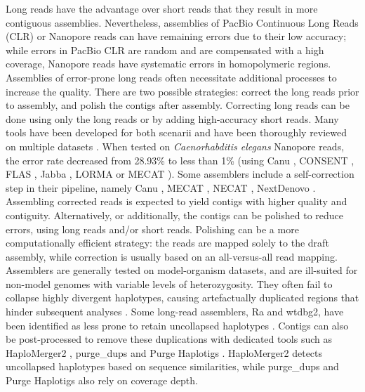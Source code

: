 Long reads have the advantage over short reads that they result in more contiguous assemblies. Nevertheless, assemblies of PacBio Continuous Long Reads (CLR) or Nanopore reads can have remaining errors due to their low accuracy; while errors in PacBio CLR are random and are compensated with a high coverage, Nanopore reads have systematic errors in homopolymeric regions. Assemblies of error-prone long reads often necessitate additional processes to increase the quality. There are two possible strategies: correct the long reads prior to assembly, and polish the contigs after assembly. Correcting long reads can be done using only the long reads or by adding high-accuracy short reads. Many tools have been developed for both scenarii and have been thoroughly reviewed on multiple datasets \cite{correction_benchmark}. When tested on \textit{Caenorhabditis elegans} Nanopore reads, the error rate decreased from 28.93\% to less than 1\% (using Canu \cite{canu}, CONSENT \cite{consent}, FLAS \cite{flas}, Jabba \cite{jabba}, LORMA \cite{lorma} or MECAT \cite{mecat}). Some assemblers include a self-correction step in their pipeline, namely Canu \cite{canu}, MECAT \cite{mecat}, NECAT \cite{necat}, NextDenovo \cite{nextdenovo}. Assembling corrected reads is expected to yield contigs with higher quality and contiguity. Alternatively, or additionally, the contigs can be polished to reduce errors, using long reads and/or short reads. Polishing can be a more computationally efficient strategy: the reads are mapped solely to the draft assembly, while correction is usually based on an all-versus-all read mapping. \\

Assemblers are generally tested on model-organism datasets, and are ill-suited for non-model genomes with variable levels of heterozygosity. They often fail to collapse highly divergent haplotypes, causing artefactually duplicated regions that hinder subsequent analyses \cite{ko2021widespread}. Some long-read assemblers, Ra and wtdbg2, have been identified as less prone to retain uncollapsed haplotypes \cite{guiglielmoni2020}. Contigs can also be post-processed to remove these duplications with dedicated tools such as HaploMerger2 \cite{haplomerger2}, purge\_dups \cite{purge_dups} and Purge Haplotigs \cite{purge_haplotigs}. HaploMerger2 detects uncollapsed haplotypes based on sequence similarities, while purge\_dups and Purge Haplotigs also rely on coverage depth. \\

